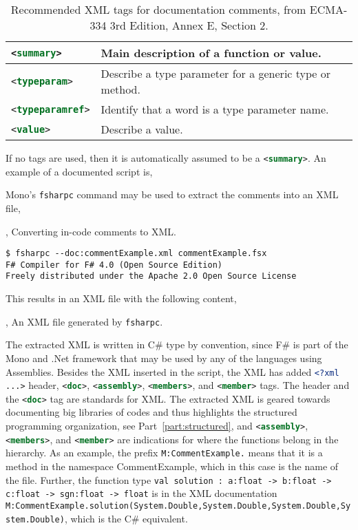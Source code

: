 \begin{table}
\begin{tabularx}{\linewidth}{|l|X|}
    \hline
    \lstinline[language=xml]!<summary>! &Main description of a function or value.\\
    \hline
    \lstinline[language=xml]!<typeparam>! &Describe a type parameter for a generic type or method.\\
    \hline
    \lstinline[language=xml]!<typeparamref>! &Identify that a word is a type parameter name.\\
    \hline
    \lstinline[language=xml]!<value>! &Describe a value.\\
    \hline
  \end{tabularx}
  \caption{Recommended XML tags for documentation comments, from ECMA-334 3rd Edition, Annex E, Section 2.}
  \label{tab:xmlTags}
\end{table}
If no tags are used, then it is automatically assumed to be a \lstinline[language=xml]!<summary>!. An example of a documented script is,
 
Mono's \lstinline[language=console]{fsharpc} command may be used to extract the comments into an XML file,
\begin{codeNOutput}{, Converting in-code comments to XML.}
  \begin{lstlisting}[language=console]
$ fsharpc --doc:commentExample.xml commentExample.fsx 
F# Compiler for F# 4.0 (Open Source Edition)
Freely distributed under the Apache 2.0 Open Source License
\end{lstlisting}
\end{codeNOutput}
This results in an XML file with the following content,
\begin{codeNOutput}{, An XML file generated by \lstinline[language=console]{fsharpc}.}
  
\end{codeNOutput}
The extracted XML is written in C\# type by convention, since F\# is part of the Mono and .Net framework that may be used by any of the languages using Assemblies. Besides the XML inserted in the script, the XML has added \lstinline[language=xml]!<?xml ...>! header, \lstinline[language=xml]!<doc>!, \lstinline[language=xml]!<assembly>!, \lstinline[language=xml]!<members>!, and \lstinline[language=xml]!<member>! tags. The header and the  \lstinline[language=xml]!<doc>! tag are standards for XML. The extracted XML is geared towards documenting big libraries of codes and thus highlights the structured programming organization, see Part~\ref{part:structured}, and \lstinline[language=xml]!<assembly>!, \lstinline[language=xml]!<members>!, and \lstinline[language=xml]!<member>! are indications for where the functions belong in the hierarchy. As an example, the prefix \lstinline[language=xml]!M:CommentExample.! means that it is a method in the namespace CommentExample, which in this case is the name of the file. Further, the function type \lstinline!val solution : a:float -> b:float -> c:float -> sgn:float -> float! is in the XML documentation \lstinline[language=xml]!M:CommentExample.solution(System.Double,System.Double,System.Double,System.Double)!, which is the C\# equivalent.


